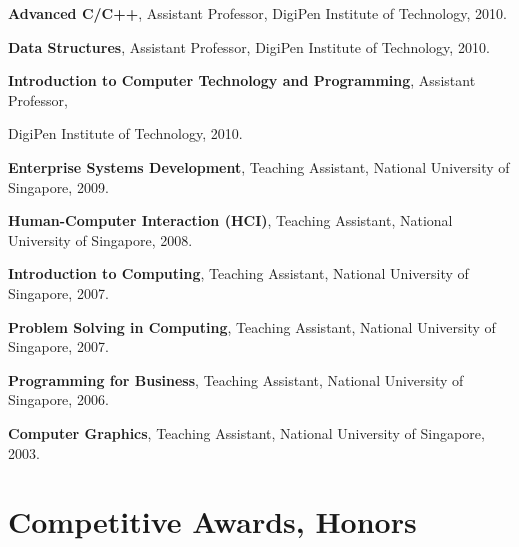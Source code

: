 \documentclass[10pt,a4paper]{article}
\renewenvironment{itemize}{
    \begin{list}{}{
            \setlength{\leftmargin}{1.5em}
            \setlength{\itemsep}{0.25em}
            \setlength{\parskip}{0pt}
            \setlength{\parsep}{0.25em}
        }
        }{
    \end{list}
}
\begin{document}
\begin{itemize}
    \item \textbf{Advanced C/C++},
        Assistant Professor, DigiPen Institute of Technology,
        2010.

    \item \textbf{Data Structures},
        Assistant Professor, DigiPen Institute of Technology,
        2010.

    \item \textbf{Introduction to Computer Technology and Programming},
        Assistant Professor, 

        DigiPen Institute of Technology,
        2010.

    \item \textbf{Enterprise Systems Development},
        Teaching Assistant, National University of Singapore,
        2009.

    \item \textbf{Human-Computer Interaction (HCI)},
        Teaching Assistant, National University of Singapore,
        2008.

    \item \textbf{Introduction to Computing},
        Teaching Assistant, National University of Singapore,
        2007.

    \item \textbf{Problem Solving in Computing},
        Teaching Assistant, National University of Singapore,
        2007.

    \item \textbf{Programming for Business},
        Teaching Assistant, National University of Singapore,
        2006.

    \item \textbf{Computer Graphics},
        Teaching Assistant, National University of Singapore,
        2003.

\end{itemize}



\section*{Competitive Awards, Honors}
\end{document}
